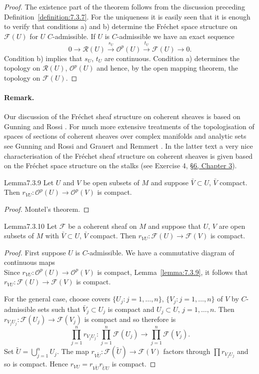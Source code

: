 \begin{proof}
The existence part of the theorem follows from the discussion preceding Definition~\ref{definition:7.3.7}. For the uniqueness it is easily seen that it is enough to verify that conditions a) and b) determine the Fr\'echet space structure on $\mathcal F(U)$ for $U$ $C$-admissible. If $U$ is $C$-admissible we have an exact sequence
\[
0\to\mathcal R(U)\xrightarrow{s_U}\mathcal O^p(U)\xrightarrow{t_U}\mathcal F(U)\to0.
\]
Condition b) implies that $s_U$, $t_U$ are continuous. Condition a) determines the topology on $\mathcal R(U)$, $\mathcal O^p(U)$ and hence, by the open mapping theorem, the topology on $\mathcal F(U)$.
\end{proof}
\paragraph{Remark.} Our discussion of the Fr\'echet sheaf structure on coherent sheaves is based on Gunning and Rossi \cite{bib:II:gunning-r-c-and-rossi-h:1}. For much more extensive treatments of the topologisation of spaces of sections of coherent sheaves over complex manifolds and analytic sets see Gunning and Rossi \cite{bib:II:gunning-r-c-and-rossi-h:1} and Grauert and Remmert \cite{bib:II:grauert-h-and-remmert-r:1}. In the latter text a very nice characterisation of the Fr\'echet sheaf structure on coherent sheaves is given based on the Fr\'echet space structure on the stalks (see Exercise 4, \hyperref[sec:3:6]{\S6, Chapter 3}).
\begin{originaltheorem}{Lemma}{7.3.9}
Let $U$ and $V$ be open subsets of $M$ and suppose $\bar V\subset U$, $\bar V$ compact. Then $r_{VU}:\mathcal O^p(U)\to\mathcal O^p(V)$ is compact.
\end{originaltheorem}
\begin{proof}
Montel's theorem.
\end{proof}
\begin{originaltheorem}{Lemma}{7.3.10}
Let $\mathcal F$ be a coherent sheaf on $M$ and suppose that $U$, $V$ are open subsets of $M$ with $\bar V\subset U$, $\bar V$ compact. Then $r_{VU}:\mathcal F(U)\to\mathcal F(V)$ is compact.
\end{originaltheorem}
\begin{proof}
First suppose $U$ is $C$-admissible. We have a commutative diagram of continuous maps
\[

\]
Since $r_{VU}:\mathcal O^p(U)\to\mathcal O^p(V)$ is compact, Lemma~\ref{lemma:7.3.9}, it follows that $r_{VU}:\mathcal F(U)\to\mathcal F(V)$ is compact.

For the general case, choose covers $\{U_j:j=1,\ldots,n\}$, $\{V_j:j=1,\ldots,n\}$ of $V$ by $C$-admissible sets such that $\bar V_j\subset U_j$ is compact and $U_j\subset U$, $j=1,\ldots,n$. Then $r_{V_jU_j}:\mathcal F(U_j)\to\mathcal F(V_j)$ is compact and so therefore is
\[
\prod_{j=1}^n r_{V_jU_j}:\prod_{j=1}^n\mathcal F(U_j)\to\prod_{j=1}^n\mathcal F(V_j).
\]
Set $\widetilde U=\bigcup_{j=1}^n U_j$. The map $r_{V\widetilde U}:\mathcal F(\widetilde U)\to\mathcal F(V)$ factors through $\prod r_{V_jU_j}$ and so is compact. Hence $r_{VU}=r_{V\widetilde U}r_{\widetilde UU}$ is compact.
\end{proof}

